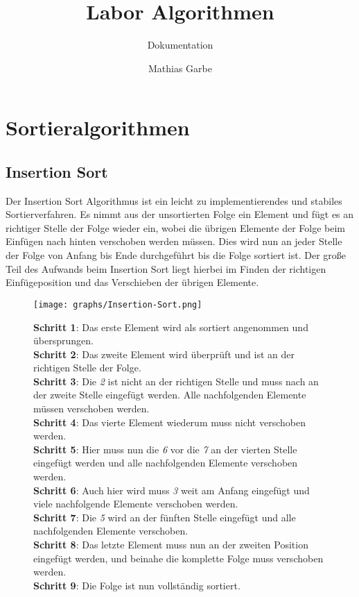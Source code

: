 \documentclass[12pt, a4paper, titlepage, hidelinks]{scrreprt}
\title{Labor Algorithmen}
\subtitle{Dokumentation}
\author{Mathias Garbe}
\begin{document}
\maketitle

\tableofcontents
{}

\clearpage


\chapter{Sortieralgorithmen}

\section{Insertion Sort}

Der Insertion Sort Algorithmus ist ein leicht zu implementierendes und stabiles Sortierverfahren. Es nimmt aus der unsortierten Folge ein Element und fügt es an richtiger Stelle der Folge wieder ein, wobei die übrigen Elemente der Folge beim Einfügen nach hinten verschoben werden müssen. Dies wird nun an jeder Stelle der Folge von Anfang bis Ende durchgeführt bis die Folge sortiert ist. Der große Teil des Aufwands beim Insertion Sort liegt hierbei im Finden der richtigen Einfügeposition und das Verschieben der übrigen Elemente.

\clearpage

\begin{SCfigure}
  \centering
  \texttt{[image: graphs/Insertion-Sort.png]}
  \caption*{\textbf{Schritt 1}: Das erste Element wird als sortiert angenommen und übersprungen. \\[45pt] %
  	\textbf{Schritt 2}: Das zweite Element wird überprüft und ist an der richtigen Stelle der Folge. \\[40pt] %
  	\textbf{Schritt 3}: Die \textit{2} ist nicht an der richtigen Stelle und muss nach an der zweite Stelle eingefügt werden. Alle nachfolgenden Elemente müssen verschoben werden. \\[15pt] %
  	\textbf{Schritt 4}: Das vierte Element wiederum muss nicht verschoben werden. \\[42pt] %
  	\textbf{Schritt 5}: Hier muss nun die \textit{6} vor die \textit{7} an der vierten Stelle eingefügt werden und alle nachfolgenden Elemente verschoben werden. \\[28pt] %
  	\textbf{Schritt 6}: Auch hier wird muss \textit{3} weit am Anfang eingefügt und viele nachfolgende Elemente verschoben werden.\\[32pt] %
  	\textbf{Schritt 7}: Die \textit{5} wird an der fünften Stelle eingefügt und alle nachfolgenden Elemente verschoben. \\[26pt] %
  	\textbf{Schritt 8}: Das letzte Element muss nun an der zweiten Position eingefügt werden, und beinahe die komplette Folge muss verschoben werden. \\[16pt] %
  	\textbf{Schritt 9}: Die Folge ist nun vollständig sortiert.
  }
\end{SCfigure}
\clearpage
\end{document}
